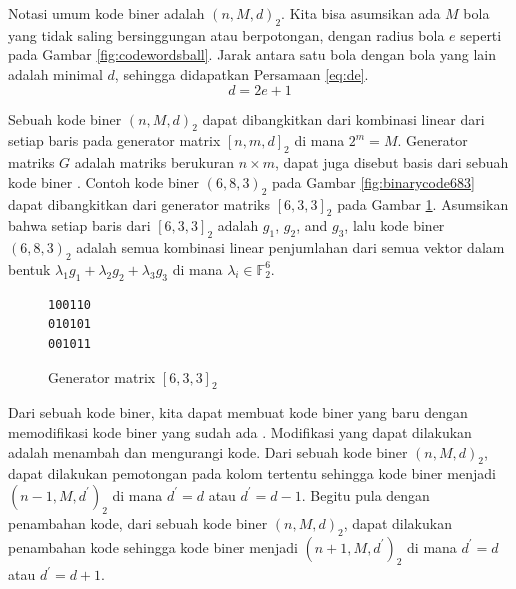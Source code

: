 Notasi umum kode biner adalah $(n,M,d)_2$. Kita bisa asumsikan ada $M$ bola yang tidak saling bersinggungan atau berpotongan, dengan radius bola $e$ seperti pada Gambar \ref{fig:codewordsball}. Jarak antara satu bola dengan bola yang lain adalah minimal $d$, sehingga didapatkan Persamaan \ref{eq:de}.
\begin{equation} \label{eq:de}
d = 2e + 1
\end{equation}

Sebuah kode biner $(n,M,d)_2$ dapat dibangkitkan dari kombinasi linear dari setiap baris pada generator matrix $[n,m,d]_2$ di mana $2^m = M$. Generator matriks $G$ adalah matriks berukuran $n \times m$, dapat juga disebut basis dari sebuah kode biner \cite{VanLint2016}. Contoh kode biner $(6,8,3)_2$ pada Gambar \ref{fig:binarycode683} dapat dibangkitkan dari generator matriks $[6,3,3]_2$ pada Gambar \ref{fig:generator633}. Asumsikan bahwa setiap baris dari $[6,3,3]_2$ adalah $g_1$, $g_2$, and $g_3$, lalu kode biner $(6,8,3)_2$ adalah semua kombinasi linear penjumlahan dari semua vektor dalam bentuk ${\lambda}_1 g_1 + {\lambda}_2 g_2 + {\lambda}_3 g_3$ di mana $\lambda{_i} \in \mathbb{F}_2^6$.

\begin{figure}
\centering
\begin{BVerbatim}
100110
010101
001011
\end{BVerbatim}
\caption{Generator matrix $[6,3,3]_2$}
\label{fig:generator633}
\end{figure}

Dari sebuah kode biner, kita dapat membuat kode biner yang baru dengan memodifikasi kode biner yang sudah ada \cite{Huffman}. Modifikasi yang dapat dilakukan adalah menambah dan mengurangi kode. Dari sebuah kode biner $(n,M,d)_2$, dapat dilakukan pemotongan pada kolom tertentu sehingga kode biner menjadi $(n-1,M,d^\prime)_2$ di mana $d^\prime=d$ atau $d^\prime=d-1$. Begitu pula dengan penambahan kode, dari sebuah kode biner $(n,M,d)_2$, dapat dilakukan penambahan kode sehingga kode biner menjadi $(n+1,M,d^\prime)_2$ di mana $d^\prime=d$ atau $d^\prime=d+1$.
